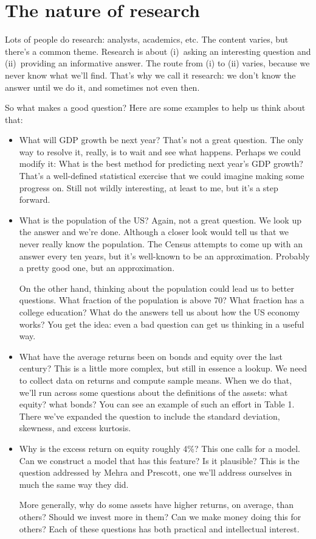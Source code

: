 \documentclass[11pt]{article}
\begin{document}
\section{The nature of research}

Lots of people do research:  analysts, academics, etc.
The content varies, but there's a common theme.
Research is about
(i)~asking an interesting question
and (ii)~providing an informative answer.
The route from (i) to (ii) varies, because we never know
what we'll find.
That's why we call it research:
we don't know the answer until we do it,
and sometimes not even then.

So what makes a good question?
Here are some examples to help us think about that:
%
\begin{itemize}
\item What will GDP growth be next year?
That's not a great question.  The only way to resolve it, really,
is to wait and see what happens.
Perhaps we could modify it:
What is the best method for predicting next year's GDP growth?
That's a well-defined statistical exercise that we could
imagine making some progress on.
Still not wildly interesting, at least to me,
but it's a step forward.

\item What is the population of the US?
Again, not a great question.
We look up the answer and we're done.
Although a closer look would tell us that we never really know
the population.
The Census attempts to come up with an answer every ten years,
but it's well-known to be an approximation.
Probably a pretty good one, but an approximation.

On the other hand, thinking about the population could lead us
to better questions.
What fraction of the population is above 70?
What fraction has a college education?
What do the answers tell us about how the US economy works?
You get the idea:  even a bad question can get us thinking in a useful way.

\item What have the average returns been on bonds and equity over the last
century?
This is a little more complex, but still in essence a lookup.
We need to collect data on returns and compute sample means.
When we do that, we'll run across some questions about the definitions
of the assets:  what equity?  what bonds?
You can see an example of such an effort in Table 1.
There we've expanded the question to include the standard deviation,
skewness, and excess kurtosis.

\item Why is the excess return on equity roughly 4\%?
This one calls for a model.
Can we construct a model that has this feature?
Is it plausible?
This is the question addressed by Mehra and Prescott,
one we'll address ourselves in much the same way they did.

More generally, why do some assets have higher returns, on average, than others?
Should we invest more in them?  Can we make money doing this for others?
Each of these questions has both practical and intellectual interest.
\end{itemize}
\end{document}
